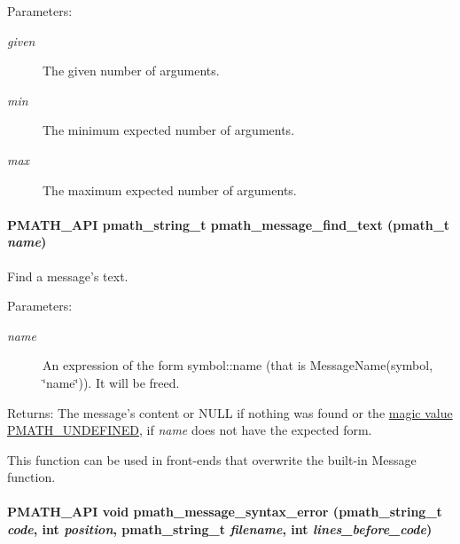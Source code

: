 \begin{Desc}
\item[Parameters:]
\begin{description}
\item[{\em given}]The given number of arguments. \item[{\em min}]The minimum expected number of arguments. \item[{\em max}]The maximum expected number of arguments. \end{description}
\end{Desc}
\hypertarget{group__messages_g7759741a35c086736838a677b5facc21}{
\paragraph[{pmath\_\-message\_\-find\_\-text}]{\setlength{\rightskip}{0pt plus 5cm}PMATH\_\-API {\bf pmath\_\-string\_\-t} pmath\_\-message\_\-find\_\-text ({\bf pmath\_\-t} {\em name})}\hfill}
\label{group__messages_g7759741a35c086736838a677b5facc21}


Find a message's text. 

\begin{Desc}
\item[Parameters:]
\begin{description}
\item[{\em name}]An expression of the form symbol::name (that is MessageName(symbol, \char`\"{}name\char`\"{})). It will be freed. \end{description}
\end{Desc}
\begin{Desc}
\item[Returns:]The message's content or NULL if nothing was found or the \hyperlink{group__objects_ge2646df76dcb0113715322b13a1f36f0}{magic value PMATH\_\-UNDEFINED}, if {\em name\/} does not have the expected form.\end{Desc}
This function can be used in front-ends that overwrite the built-in Message function. \hypertarget{group__messages_g1091404d83f219f7e18a70642007be4a}{
\paragraph[{pmath\_\-message\_\-syntax\_\-error}]{\setlength{\rightskip}{0pt plus 5cm}PMATH\_\-API void pmath\_\-message\_\-syntax\_\-error ({\bf pmath\_\-string\_\-t} {\em code}, \/  int {\em position}, \/  {\bf pmath\_\-string\_\-t} {\em filename}, \/  int {\em lines\_\-before\_\-code})}\hfill}
\label{group__messages_g1091404d83f219f7e18a70642007be4a}


